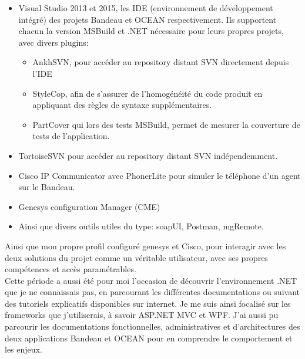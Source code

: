 \documentclass{rapport}
\begin{document}
\begin{itemize}
  \item Visual Studio 2013 et 2015, les IDE (environnement de développement intégré) des projets Bandeau et OCEAN respectivement. Ils supportent chacun la version MSBuild et .NET nécessaire pour leurs propres projets, avec divers plugins:
  
    \begin{itemize}
        \item AnkhSVN, pour accéder au repository distant SVN directement depuis l'IDE
  
        \item StyleCop, afin de s'assurer de l'homogénéité du code produit en appliquant des règles de syntaxe supplémentaires.
  
        \item PartCover qui lors des tests MSBuild, permet de mesurer la couverture de tests de l'application.
    \end{itemize}

  \item TortoiseSVN pour accéder au repository distant SVN indépendemment.
  
  \item Cisco IP Communicator avec PhonerLite pour simuler le téléphone d'un agent sur le Bandeau.
  
  \item Genesys configuration Manager (CME)
  
  \item Ainsi que divers outils utiles du type: soapUI, Postman, mgRemote.
  
\end{itemize}

Ainsi que mon propre profil configuré genesys et Cisco, pour interagir avec les deux solutions du projet comme un véritable utilisateur, avec ses propres compétences et accès paramétrables.\\

Cette période a aussi été pour moi l'occasion de découvrir l'environnement .NET que je ne connaissais pas, en parcourant les différentes documentations ou suivant des tutoriels explicatifs disponibles sur internet. Je me suis ainsi focalisé sur les frameworks que j'utiliserais, à savoir ASP.NET MVC et WPF. J'ai aussi pu parcourir les documentations fonctionnelles, administratives et d'architectures des deux applications Bandeau et OCEAN pour en comprendre le comportement et les enjeux.\\
\end{document}
